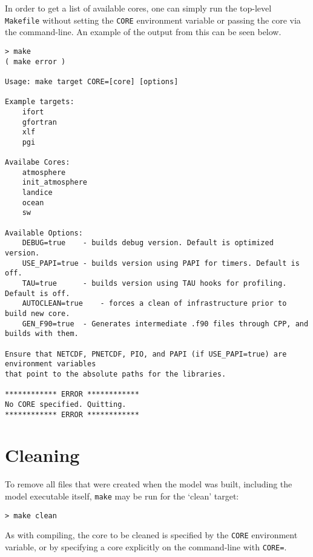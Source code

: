 In order to get a list of available cores, one can simply run the top-level {\tt
Makefile} without setting the {\tt CORE} environment variable or passing the
core via the command-line. An example of the output from this can be seen
below.

{\small
\begin{verbatim}
> make
( make error )

Usage: make target CORE=[core] [options]

Example targets:
    ifort
    gfortran
    xlf
    pgi

Availabe Cores:
    atmosphere
    init_atmosphere
    landice
    ocean
    sw

Available Options:
    DEBUG=true    - builds debug version. Default is optimized version.
    USE_PAPI=true - builds version using PAPI for timers. Default is off.
    TAU=true      - builds version using TAU hooks for profiling. Default is off.
    AUTOCLEAN=true    - forces a clean of infrastructure prior to build new core.
    GEN_F90=true  - Generates intermediate .f90 files through CPP, and builds with them.

Ensure that NETCDF, PNETCDF, PIO, and PAPI (if USE_PAPI=true) are environment variables
that point to the absolute paths for the libraries.

************ ERROR ************
No CORE specified. Quitting.
************ ERROR ************
\end{verbatim}
}

\section{Cleaning}

To remove all files  that were created when the model was built,
including the model executable itself, {\tt make} may be run for the
`clean' target:

\vspace{12pt}
{\tt > make clean}
\vspace{12pt}

As with compiling, the core to be cleaned is specified by the {\tt CORE}
environment variable, or by specifying a core explicitly on the
command-line with {\tt CORE=}.
